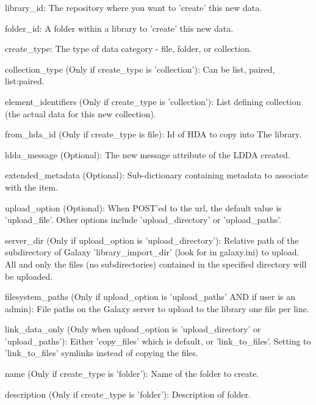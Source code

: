 \begin{DoxyItemize}
\item library\-\_\-id\-: The repository where you want to 'create' this new data.
\item folder\-\_\-id\-: A folder within a library to 'create' this new data.
\item create\-\_\-type\-: The type of data category -\/ file, folder, or collection.
\item collection\-\_\-type (Only if create\-\_\-type is 'collection')\-: Can be list, paired, list\-:paired.
\item element\-\_\-identifiers (Only if create\-\_\-type is 'collection')\-: List defining collection (the actual data for this new collection).
\item from\-\_\-hda\-\_\-id (Only if create\-\_\-type is file)\-: Id of H\-D\-A to copy into The library.
\item ldda\-\_\-message (Optional)\-: The new message attribute of the L\-D\-D\-A created.
\item extended\-\_\-metadata (Optional)\-: Sub-\/dictionary containing metadata to associate with the item.
\item upload\-\_\-option (Optional)\-: When P\-O\-S\-T'ed to the url, the default value is 'upload\-\_\-file'. Other options include 'upload\-\_\-directory' or 'upload\-\_\-paths'.
\item server\-\_\-dir (Only if upload\-\_\-option is 'upload\-\_\-directory')\-: Relative path of the subdirectory of Galaxy 'library\-\_\-import\-\_\-dir' (look for in galaxy.\-ini) to upload. All and only the files (no subdirectories) contained in the specified directory will be uploaded.
\item filesystem\-\_\-paths (Only if upload\-\_\-option is 'upload\-\_\-paths' A\-N\-D if user is an admin)\-: File paths on the Galaxy server to upload to the library one file per line.
\item link\-\_\-data\-\_\-only (Only when upload\-\_\-option is 'upload\-\_\-directory' or 'upload\-\_\-paths')\-: Either 'copy\-\_\-files' which is default, or 'link\-\_\-to\-\_\-files'. Setting to 'link\-\_\-to\-\_\-files' symlinks instead of copying the files.
\item name (Only if create\-\_\-type is 'folder')\-: Name of the folder to create.
\item description (Only if create\-\_\-type is 'folder')\-: Description of folder.
\end{DoxyItemize}

